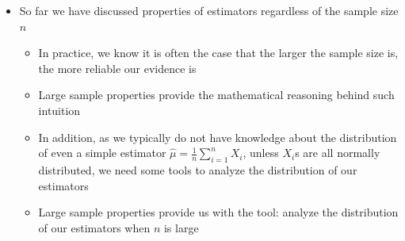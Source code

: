 \documentclass{article}
\begin{document}
\begin{itemize}
\begin{itemize}
    \end{itemize}
    \item So far we have discussed properties of estimators regardless of the sample size $n$
    \begin{itemize}
        \item In practice, we know it is often the case that the larger the sample size is, the more reliable our evidence is
        \item Large sample properties provide the mathematical reasoning behind such intuition
        \item In addition, as we typically do not have knowledge about the distribution of even a simple estimator $\hat{\mu} = \frac{1}{n} \sum_{i=1}^n X_i$, unless $X_i$s are all normally distributed, we need some tools to analyze the distribution of our estimators
        \item Large sample properties provide us with the tool: analyze the distribution of our estimators when $n$ is large
    \end{itemize}
\end{itemize}
\end{document}
